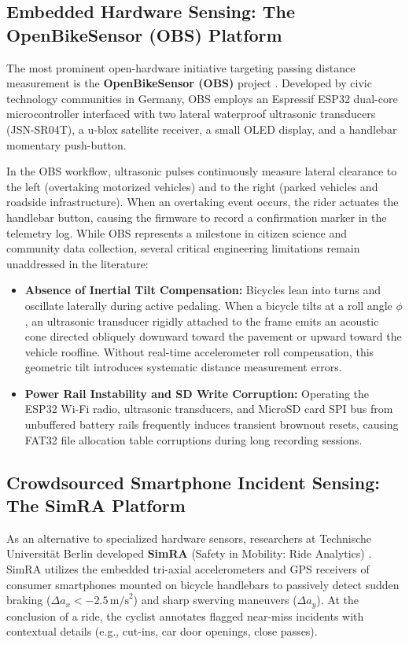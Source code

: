 \subsection{Embedded Hardware Sensing: The OpenBikeSensor (OBS) Platform}
The most prominent open-hardware initiative targeting passing distance measurement is the \textbf{OpenBikeSensor (OBS)} project \cite{ehrenwirth2020openbikesensor}. Developed by civic technology communities in Germany, OBS employs an Espressif ESP32 dual-core microcontroller interfaced with two lateral waterproof ultrasonic transducers (JSN-SR04T), a u-blox satellite receiver, a small OLED display, and a handlebar momentary push-button.

In the OBS workflow, ultrasonic pulses continuously measure lateral clearance to the left (overtaking motorized vehicles) and to the right (parked vehicles and roadside infrastructure). When an overtaking event occurs, the rider actuates the handlebar button, causing the firmware to record a confirmation marker in the telemetry log. While OBS represents a milestone in citizen science and community data collection, several critical engineering limitations remain unaddressed in the literature:
\begin{itemize}
    \item \textbf{Absence of Inertial Tilt Compensation:} Bicycles lean into turns and oscillate laterally during active pedaling. When a bicycle tilts at a roll angle $\phi$, an ultrasonic transducer rigidly attached to the frame emits an acoustic cone directed obliquely downward toward the pavement or upward toward the vehicle roofline. Without real-time accelerometer roll compensation, this geometric tilt introduces systematic distance measurement errors.
    \item \textbf{Power Rail Instability and SD Write Corruption:} Operating the ESP32 Wi-Fi radio, ultrasonic transducers, and MicroSD card SPI bus from unbuffered battery rails frequently induces transient brownout resets, causing FAT32 file allocation table corruptions during long recording sessions.
\end{itemize}

\subsection{Crowdsourced Smartphone Incident Sensing: The SimRA Platform}
As an alternative to specialized hardware sensors, researchers at Technische Universit{\"a}t Berlin developed \textbf{SimRA} (Safety in Mobility: Ride Analytics) \cite{simra2020crowdsourcing}. SimRA utilizes the embedded tri-axial accelerometers and GPS receivers of consumer smartphones mounted on bicycle handlebars to passively detect sudden braking ($\Delta a_x < -2.5\,\text{m/s}^2$) and sharp swerving maneuvers ($\Delta a_y$). At the conclusion of a ride, the cyclist annotates flagged near-miss incidents with contextual details (e.g., cut-ins, car door openings, close passes).

